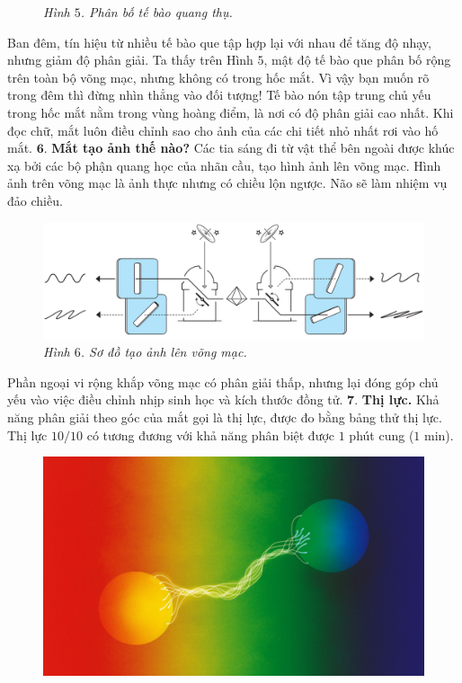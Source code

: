 \begin{multicols}{2}
\begin{figure}[H]
		\caption{\small\textit{\color{timhieukhoahoc}Hình $5$. Phân bố tế bào quang thụ.}}
		\vspace*{-5pt}
	\end{figure}	
	Ban đêm, tín hiệu từ nhiều tế bào que tập hợp lại với nhau để tăng độ nhạy, nhưng giảm độ phân giải. Ta thấy trên Hình $5$, mật độ tế bào que phân bố rộng trên toàn bộ võng mạc, nhưng không có trong hốc mắt. Vì vậy bạn muốn rõ trong đêm thì đừng nhìn thẳng vào đối tượng! Tế bào nón tập trung chủ yếu trong hốc mắt nằm trong vùng hoàng điểm, là nơi có độ phân giải cao nhất. Khi đọc chữ, mắt luôn điều chỉnh sao cho ảnh của các chi tiết nhỏ nhất rơi vào hố mắt.
	\vskip 0.1cm
	$\pmb{6.}$ \textbf{\color{timhieukhoahoc}Mắt tạo ảnh thế nào?}
	\vskip 0.1cm
	Các tia sáng đi từ vật thể bên ngoài được khúc xạ bởi các bộ phận quang học của nhãn cầu, tạo hình ảnh lên võng mạc. Hình ảnh trên võng mạc là ảnh thực nhưng có chiều lộn ngược. Não sẽ làm nhiệm vụ đảo chiều. 
	\begin{figure}[H]
		\vspace*{-5pt}
		\centering
		\captionsetup{labelformat= empty, justification=centering}
		\includegraphics[width= 1\linewidth]{6}
		\caption{\small\textit{\color{timhieukhoahoc}Hình $6$. Sơ đồ tạo ảnh lên võng mạc.}}
		\vspace*{-10pt}
	\end{figure}
	Phần ngoại vi rộng khắp võng mạc có phân giải thấp, nhưng lại đóng góp chủ yếu vào việc điều chỉnh nhịp sinh học và kích thước đồng tử. 
	\vskip 0.1cm
	$\pmb{7.}$ \textbf{\color{timhieukhoahoc}Thị lực.}
	\vskip 0.1cm
	Khả năng phân giải theo góc của mắt gọi là thị lực, được đo bằng bảng thử thị lực. Thị lực $10/10$ có tương đương với khả năng phân biệt được $1$ phút cung ($1$ min). 
	\begin{figure}[H]
		\vspace*{-5pt}
		\centering
		\captionsetup{labelformat= empty, justification=centering}
		\includegraphics[width= 1\linewidth]{7}

\end{figure}
\end{multicols}
